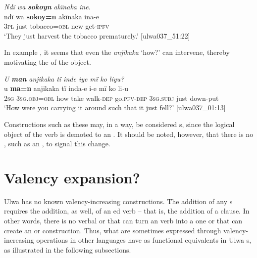 \ea%
    \label{ex:syntax:347}
          \textit{Ndï wa} \textbf{\textit{sokoyn}} \textit{akïnaka ine.}\\
\gll    ndï  wa  \textbf{sokoy=n}    akïnaka  ina-e\\
    3\textsc{pl}  just  tobacco=\textsc{obl}  new    get-\textsc{ipfv}\\
\glt `They just harvest the tobacco prematurely.’ [ulwa037\_51:22]
\z

In example , it seems that even the  \textit{anjikaka} ‘how?’ can intervene, thereby motivating the  of the object.

\ea%
    \label{ex:syntax:348}
          \textit{U} \textbf{\textit{man}} \textit{anjikaka tï inde iye mï ko liyu?}\\
\gll    u    \textbf{ma=n}      anjikaka  tï  inda-e    i-e mï      ko  li\textit{{}-}u\\
    2\textsc{sg}   3\textsc{sg.obj=obl}  how    take  walk\textsc{{}-dep} go.\textsc{pfv-dep}    3\textsc{sg.subj}  just  down-put\\
\glt `How were you carrying it around such that it just fell?’ [ulwa037\_01:13]
\z

Constructions such as these may, in a way, be considered s, since the logical object of the  verb is demoted to an  . It should be noted, however, that there is no , such as an , to signal this change.


\section{Valency expansion?}\label{sec:13.9}


Ulwa has no known valency-increasing constructions. The addition of any s requires the addition, as well, of an ed verb -- that is, the addition of a clause. In other words, there is no verbal  or  that can turn an  verb into a  one or that can create an  or  construction. Thus, what are sometimes expressed through valency-increasing operations in other languages have as functional equivalents in Ulwa s, as illustrated in the following subsections.

